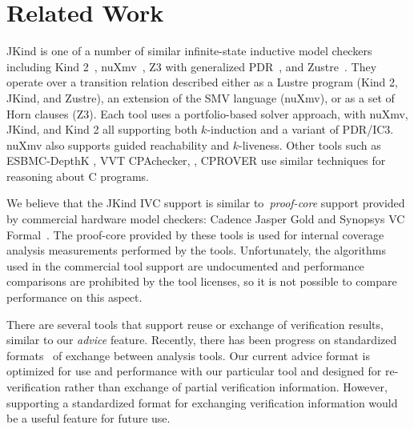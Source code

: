 \documentclass{llncs}
\newcommand{\jkind}{{\sc JKind}\xspace}
\newcommand{\kind}{{\sc Kind}\xspace}
\newcommand{\lustre}{{\sc Lustre}\xspace}
\newcommand{\gryphon}{{\sc Gryphon}\xspace}
\newcommand{\nuxmv}{{\sc nuXmv}\xspace}
\newcommand{\zustre}{{\sc Zustre}\xspace}
\newcommand{\zthree}{{\sc Z3}\xspace}
\renewcommand{\paragraph}[1]{\vspace{5pt}\noindent {\bf #1}}
\begin{document}

\section{Related Work}
\jkind is one of a number of similar infinite-state inductive model
checkers including {\sc Kind 2}~\cite{champion2016cav},
\nuxmv~\cite{cimatti2014tacas}, \zthree with generalized
PDR~\cite{GPDR}, and \zustre~\cite{Zustre}. They operate over a
transition relation described either as a \lustre program (\kind 2,
\jkind, and \zustre), an extension of the SMV language (\nuxmv), or as
a set of Horn clauses (\zthree).  Each tool uses a portfolio-based
solver approach, with \nuxmv, \jkind, and \kind 2 all
supporting both $k$-induction and a variant of PDR/IC3.  \nuxmv also
supports guided reachability and $k$-liveness.  Other tools such as
{\sc ESBMC-DepthK} \cite{rocha2017model}, {\sc VVT}
\cite{beyer2016smt} {\sc CPAchecker}, \cite{beyer2015boosting}, {\sc
  CPROVER} \cite{brain2015safety} use similar techniques for
reasoning about C programs.

We believe that the \jkind IVC support is similar to~\emph{proof-core} support provided by commercial hardware model checkers: Cadence Jasper Gold and Synopsys VC Formal~\cite{hanna2015formal, jasper_gold, Synopsys_VC_formal}.  The proof-core provided by these tools is used for internal coverage analysis measurements performed by the tools.  Unfortunately, the algorithms used in the commercial tool support are undocumented and performance comparisons are prohibited by the tool licenses, so it is not possible to compare performance on this aspect.

There are several tools that support reuse or exchange of verification results, similar to our {\em advice} feature.  Recently, there has been progress on standardized formats~\cite{Beyer:2016} of exchange between analysis tools.  Our current advice format is optimized for use and performance with our particular tool and designed for re-verification rather than exchange of partial verification information.  However, supporting a standardized format for exchanging verification information would be a useful feature for future use.
\end{document}
